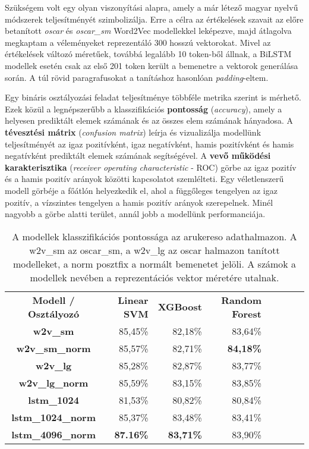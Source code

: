 Szükségem volt egy olyan viszonyítási alapra, amely a már létező magyar nyelvű módszerek teljesítményét szimbolizálja. Erre a célra az értékelések szavait az előre betanított \textit{oscar} és \textit{oscar\_sm} Word2Vec modellekkel leképezve, majd átlagolva megkaptam a véleményeket reprezentáló 300 hosszú vektorokat. Mivel az értékelések változó méretűek, továbbá legalább 10 token-ből állnak, a BiLSTM modellek esetén csak az első 201 token került a bemenetre a vektorok generálása során. A túl rövid paragrafusokat a tanításhoz hasonlóan \textit{padding}-eltem.

Egy bináris osztályozási feladat teljesítménye többféle metrika szerint is mérhető. Ezek közül a legnépszerűbb a klasszifikációs \textbf{pontosság} (\textit{accuracy}), amely a helyesen prediktált elemek számának és az összes elem számának hányadosa. A \textbf{tévesztési mátrix} (\textit{confusion matrix}) leírja és vizualizálja modellünk teljesítményét az igaz pozitívként, igaz negatívként, hamis pozitívként és hamis negatívként prediktált elemek számának segítségével. A \textbf{vevő működési karakterisztika} (\textit{receiver operating characteristic} - ROC) görbe az igaz pozitív és a hamis pozitív arányok közötti kapcsolatot szemlélteti. Egy véletlenszerű modell görbéje a főátlón helyezkedik el, ahol a függőleges tengelyen az igaz pozitív, a vízszintes tengelyen a hamis pozitív arányok szerepelnek. Minél nagyobb a görbe alatti terület, annál jobb a modellünk performanciája.

\begin{table}[H]
	\centering
	\begin{tabular}{ | c | r | r | r | r | r | r | r |}
		\hline
		\multirow{2}{*}{\textbf{Modell / Osztályozó}} & \multirow{2}{*}{\textbf{Linear SVM}} & \multirow{2}{*}{\textbf{XGBoost}} & \multirow{2}{*}{\textbf{Random Forest}} \\
		& & & \\
		\hline \hline		
		\textbf{w2v\_sm} & 85,45\% & 82,18\% & 83,64\% \\
		\hline
		\textbf{w2v\_sm\_norm} & 85,57\% & 82,71\% & \textbf{84,18\%} \\
		\hline
		\textbf{w2v\_lg} & 85,28\% & 82,87\% & 83,77\% \\
		\hline
		\textbf{w2v\_lg\_norm} & 85,59\% & 83,15\% & 83,85\% \\
		\hline  
		\textbf{lstm\_1024} & 81,53\% & 80,82\% & 80,84\% \\
		\hline  
		\textbf{lstm\_1024\_norm} & 85,37\% & 83,48\% & 83,41\% \\
		\hline
		\textbf{lstm\_4096\_norm} & \textbf{87.16\%} & \textbf{83,71\%} & 83,90\% \\
		\hline
	\end{tabular}
	\caption[A modellek pontossága]{A modellek klasszifikációs pontossága az arukereso adathalmazon. A w2v\_sm az oscar\_sm, a w2v\_lg az oscar halmazon tanított modelleket, a norm posztfix a normált bemenetet jelöli. A számok a modellek nevében a reprezentációs vektor méretére utalnak.}
	\label{tab:evaluation}
\end{table}

